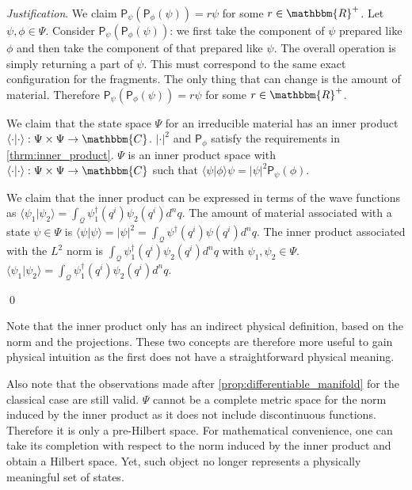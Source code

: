 \documentclass[aps,pra,10pt,twocolumn,floatfix,nofootinbib]{revtex4-1}
\numberwithin{equation}{section}
\theoremstyle{definition}
\newenvironment{justification}{\emph{Justification}.}{\qed}
\begin{document}
\begin{justification}
	We claim $\mathsf{P}_{\psi} (\mathsf{P}_{\phi} (\psi)) = r \psi$ for some $r \in \mathbbm{R}^+$. Let $\psi, \phi \in \Psi$. Consider $\mathsf{P}_{\psi} (\mathsf{P}_{\phi} (\psi))$: we first take the component of $\psi$ prepared like $\phi$ and then take the component of that prepared like $\psi$. The overall operation is simply returning a part of $\psi$. This must correspond to the same exact configuration for the fragments. The only thing that can change is the amount of material. Therefore $\mathsf{P}_{\psi} (\mathsf{P}_{\phi} (\psi)) = r \psi$ for some $r \in \mathbbm{R}^+$.
	
	We claim that the state space $\Psi$ for an irreducible material has an inner product $\langle \cdot |\cdot \rangle : \Psi \times \Psi \rightarrow \mathbbm{C}$. $| \cdot | ^2$ and $\mathsf{P}_{\phi}$ satisfy the requirements in \ref{thrm:inner_product}. $\Psi$ is an inner product space with $\langle \cdot |\cdot \rangle : \Psi \times \Psi \rightarrow \mathbbm{C}$ such that $\langle \psi |\phi \rangle \psi = | \psi | ^2\mathsf{P}_{\psi}(\phi)$.
	
	We claim that the inner product can be expressed in terms of the wave functions as $\langle \psi_1 | \psi_2 \rangle = \int_\mathcal{Q} \psi_1^\dagger (q^i) \psi_2(q^i) d^nq$. The amount of material associated with a state $\psi \in \Psi$ is $\langle \psi | \psi \rangle = | \psi |^2 = \int_\mathcal{Q} \psi^\dagger (q^i) \psi(q^i) d^nq$. The inner product associated with the $L^2$ norm is $\int_\mathcal{Q} \psi_1^\dagger (q^i) \psi_2(q^i) d^nq$ with $\psi_1, \psi_2 \in \Psi$. $\langle \psi_1 | \psi_2 \rangle = \int_\mathcal{Q} \psi_1^\dagger (q^i) \psi_2(q^i) d^nq$.
	
\end{justification}

Note that the inner product only has an indirect physical definition, based on the norm and the projections. These two concepts are therefore more useful to gain physical intuition as the first does not have a straightforward physical meaning.

Also note that the observations made after \ref{prop:differentiable_manifold} for the  classical case are still valid. $\Psi$ cannot be a complete metric space for the norm induced by the inner product as it does not include discontinuous functions. Therefore it is only a pre-Hilbert space. For mathematical convenience, one can take its completion with respect to the norm induced by the inner product and obtain a Hilbert space. Yet, such object no longer represents a physically meaningful set of states.
\end{document}
